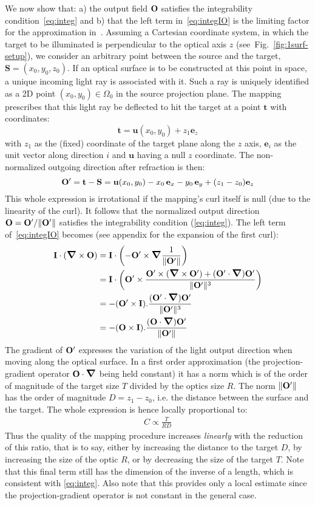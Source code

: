 We now show that: a) the output field $\mathbf{O}$ satisfies the
integrability condition~\eqref{eq:integ} and b) that the left term
in~\eqref{eq:integIO} is the limiting factor for the approximation
in~\cite{Baeuerle2012}. Assuming a Cartesian coordinate system, in
which the target to be illuminated is perpendicular to the optical
axis $z$ (see~Fig.~\ref{fig:1surf-setup}), we consider an arbitrary
point between the source and the target, $\mathbf{S}=(x_0,y_0,z_0)$.
If an optical surface is to be constructed at this point in space, a
unique incoming light ray is associated with it. Such a ray is
uniquely identified as a 2D point $(x_0,y_0)\in\Omega_0$ in the source
projection plane. The mapping prescribes that this light ray be
deflected to hit the target at a point $\mathbf{t}$ with coordinates:
\[ \mathbf{t} = \mathbf{u}(x_0, y_0) + z_1 \mathbf{e}_z \]
with $z_1$ as the (fixed) coordinate of the target plane along the $z$
axis, $\mathbf{e}_i$ as the unit vector along direction $i$ and $\mathbf{u}$
having a null $z$ coordinate.  The
non-normalized outgoing direction after refraction is then:
\[  \mathbf{O}' =  \mathbf{t} - \mathbf{S} = 
          \mathbf{u}(x_0, y_0) - x_0\,\mathbf{e}_x -y_0\,\mathbf{e}_y +
          (z_1-z_0) \mathbf{e}_z \] 
This whole expression is irrotational if the mapping's curl itself is
null (due to the linearity of the curl).  It follows that the
normalized output direction $\mathbf{O} = \mathbf{O}' / \|\mathbf{O}'\| $ satisfies the
integrability condition (\ref{eq:integ}).
The left term of~\eqref{eq:integIO} becomes (see appendix for the 
expansion of the first curl):
\begin{align*}
\I\cdot(\curl{\OO}) & = \I \cdot \left(-\Op\times
\grad{\frac{1}{\|\Op\|}}\right) \\ 
& = \I \cdot \left(\Op\times \frac{\Op \times (\curl{\Op}) +
  (\Op\cdot\grad{})\Op} {\|\Op\|^3} \right) \\ 
&= - (\Op \times \I).\frac{(\Op\cdot\grad{})\Op}{\|\Op\|^3} \\
&= - (\OO \times \I).\frac{(\OO\cdot\grad{})\Op}{\|\Op\|} \\
\end{align*}
The gradient of $\mathbf{O}'$ expresses the variation of the light output
direction when moving along the optical surface.  In a first order
approximation (the projection-gradient operator $\OO\cdot\grad{}$
being held constant) it has a norm which is of the order of magnitude
of the target size $T$ divided by the optics size $R$. The norm
$\|\mathbf{O}'\|$ has the order of magnitude $D=z_1-z_0$, i.e. the distance
between the surface and the target.  The whole expression is hence
locally proportional to:
\begin{eqnarray}
 C \propto \frac{T}{RD} 
 \label{eq:map_quality}
\end{eqnarray}
Thus the quality of the mapping procedure increases \emph{linearly}
with the reduction of this ratio, that is to say, either by increasing
the distance to the target $D$, by increasing the size of the optic
$R$, or by decreasing the size of the target $T$. Note that this final
term still has the dimension of the inverse of a length, which is
consistent with \eqref{eq:integ}. Also note that this provides only a
local estimate since the projection-gradient operator is not constant
in the general case.


